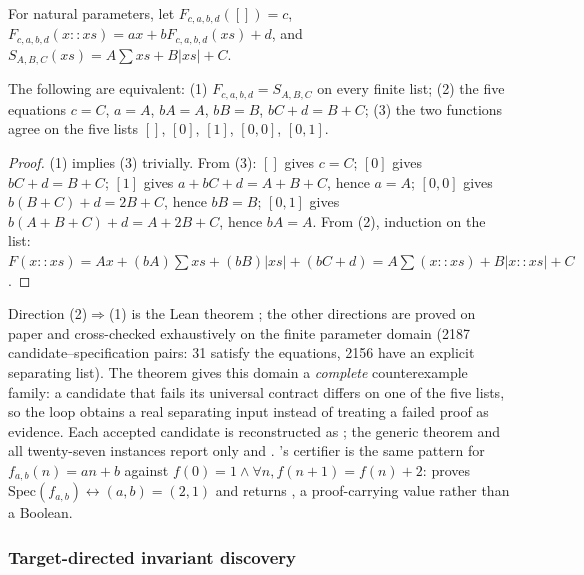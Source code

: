 For natural parameters, let $F_{c,a,b,d}([])=c$, $F_{c,a,b,d}(x::xs)=ax+bF_{c,a,b,d}(xs)+d$, and $S_{A,B,C}(xs)=A\sum xs+B|xs|+C$.
\begin{theorem}
The following are equivalent: (1) $F_{c,a,b,d}=S_{A,B,C}$ on every finite list; (2) the five equations $c=C$, $a=A$, $bA=A$, $bB=B$, $bC+d=B+C$; (3) the two functions agree on the five lists $[]$, $[0]$, $[1]$, $[0,0]$, $[0,1]$.
\end{theorem}
\begin{proof}
(1) implies (3) trivially. From (3): $[]$ gives $c=C$; $[0]$ gives $bC+d=B+C$; $[1]$ gives $a+bC+d=A+B+C$, hence $a=A$; $[0,0]$ gives $b(B+C)+d=2B+C$, hence $bB=B$; $[0,1]$ gives $b(A+B+C)+d=A+2B+C$, hence $bA=A$. From (2), induction on the list: $F(x::xs)=Ax+(bA)\sum xs+(bB)|xs|+(bC+d)=A\sum(x::xs)+B|x::xs|+C$.
\end{proof}
Direction (2)$\Rightarrow$(1) is the Lean theorem ; the other directions are proved on paper and cross-checked exhaustively on the finite parameter domain (2187 candidate--specification pairs: 31 satisfy the equations, 2156 have an explicit separating list). The theorem gives this domain a \emph{complete} counterexample family: a candidate that fails its universal contract differs on one of the five lists, so the loop obtains a real separating input instead of treating a failed proof as evidence. Each accepted candidate is reconstructed as ; the generic theorem and all twenty-seven instances report only  and . 's certifier is the same pattern for $f_{a,b}(n)=an+b$ against $f(0)=1\wedge\forall n, f(n+1)=f(n)+2$:  proves $\mathrm{Spec}(f_{a,b})\leftrightarrow(a,b)=(2,1)$ and  returns , a proof-carrying value rather than a Boolean.

\subsubsection{Target-directed invariant discovery}

